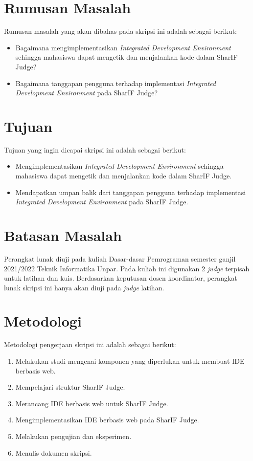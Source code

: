 \pagebreak

\section{Rumusan Masalah}
\label{sec:rumusan}
Rumusan masalah yang akan dibahas pada skripsi ini adalah sebagai berikut:
\begin{itemize}
	\item Bagaimana mengimplementasikan {\it Integrated Development Environment} sehingga mahasiswa dapat mengetik dan menjalankan kode dalam SharIF Judge?
	\item Bagaimana tanggapan pengguna terhadap implementasi {\it Integrated Development Environment} pada SharIF Judge? 
\end{itemize}


\section{Tujuan}
\label{sec:tujuan}
Tujuan yang ingin dicapai skripsi ini adalah sebagai berikut:
\begin{itemize}
	\item Mengimplementasikan {\it Integrated Development Environment} sehingga mahasiswa dapat mengetik dan menjalankan kode dalam SharIF Judge.
	\item Mendapatkan umpan balik dari tanggapan pengguna terhadap implementasi {\it Integrated Development Environment} pada SharIF Judge.
\end{itemize}

\section{Batasan Masalah}
\label{sec:batasan}
Perangkat lunak diuji pada kuliah Dasar-dasar Pemrograman semester ganjil 2021/2022 Teknik Informatika Unpar. Pada kuliah ini digunakan 2 \textit{judge} terpisah untuk latihan dan kuis. Berdasarkan keputusan dosen koordinator, perangkat lunak skripsi ini hanya akan diuji pada \textit{judge} latihan.

\section{Metodologi}
\label{sec:metlit}
Metodologi pengerjaan skripsi ini adalah sebagai berikut:
\begin{enumerate}
	\item Melakukan studi mengenai komponen yang diperlukan untuk membuat IDE berbasis web.
	\item Mempelajari struktur SharIF Judge.
	\item Merancang IDE berbasis web untuk SharIF Judge.
	\item Mengimplementasikan IDE berbasis web pada SharIF Judge.
	\item Melakukan pengujian dan eksperimen.
	\item Menulis dokumen skripsi.
\end{enumerate}


